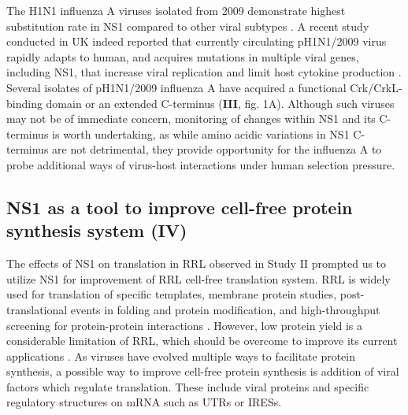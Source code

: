 		The H1N1 influenza A viruses isolated from 2009 demonstrate highest substitution rate in NS1 compared to other viral subtypes \parencite{Xu2011}. A recent study conducted in UK indeed reported that currently circulating pH1N1/2009 virus rapidly adapts to human, and acquires mutations in multiple viral genes, including NS1, that increase viral replication and limit host cytokine production \parencite{Elderfield2014}. Several isolates of pH1N1/2009 influenza A have acquired a functional Crk/CrkL-binding domain or an extended C-terminus (\textbf{III}, fig. 1A). Although such viruses may not be of immediate concern, monitoring of changes within NS1 and its C-terminus is worth undertaking, as while amino acidic variations in NS1 C-terminus are not detrimental, they provide opportunity for the influenza A to probe additional ways of virus-host interactions under human selection pressure.
		
		 
	
	\subsection{NS1 as a tool to improve cell-free protein synthesis system (IV)}
	
		The effects of NS1 on translation in \gls{RRL} observed in Study II prompted us to utilize NS1 for improvement of \gls{RRL} cell-free translation system. \gls{RRL} is widely used for translation of specific templates, membrane protein studies, post-translational events in folding and protein modification, and high-throughput screening for protein-protein interactions \parencite{Fuller2000, Douthwaite2012, Fixsen2010, Wang2011}. However, low protein yield is a considerable limitation of RRL, which should be overcome to improve its current applications \parencite{Carlson2012}. As viruses have evolved multiple ways to facilitate protein synthesis, a possible way to improve cell-free protein synthesis is addition of viral factors which regulate translation. These include viral proteins and specific regulatory structures on mRNA such as \gls{UTR}s or \glspl{IRES}. 
	

